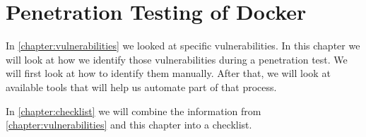 \chapter{Penetration Testing of Docker}\label{chapter:pentesting}
In \autoref{chapter:vulnerabilities} we looked at specific vulnerabilities. In this chapter we will look at how we identify those vulnerabilities during a penetration test. We will first look at how to identify them manually. After that, we will look at available tools that will help us automate part of that process.

\medskip

In \autoref{chapter:checklist} we will combine the information from \autoref{chapter:vulnerabilities} and this chapter into a checklist.



